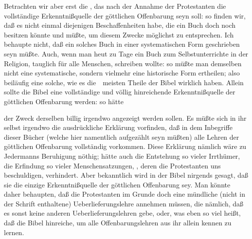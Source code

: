 \begin{aufza}
\begin{aufzb}
\end{aufzb}
\item Betrachten wir aber erst die , das nach der Annahme der Protestanten die vollständige Erkenntnißquelle der göttlichen Offenbarung seyn soll: so finden wir, daß es nicht einmal diejenigen Beschaffenheiten habe, die ein Buch doch noch besitzen könnte und müßte, um diesem Zwecke möglichst zu entsprechen. Ich behaupte nicht, daß ein solches Buch in einer systematischen Form geschrieben seyn müßte. Auch, wenn man heut zu Tage ein Buch zum Selbstunterrichte in der Religion, tauglich für alle Menschen, schreiben wollte: so müßte man demselben nicht eine systematische, sondern vielmehr eine historische Form ertheilen; also beiläufig eine solche, wie es die~\ meisten Theile der Bibel wirklich haben. Allein sollte die Bibel eine vollständige und völlig hinreichende Erkenntnißquelle der göttlichen Offenbarung werden: so hätte
\begin{aufzb}
\item der Zweck derselben billig  irgendwo angezeigt werden sollen. Es müßte sich in ihr selbst irgendwo die ausdrückliche Erklärung vorfinden, daß in dem Inbegriffe dieser Bücher (welche hier namentlich aufgezählt seyn müßten) alle Lehren der göttlichen Offenbarung vollständig vorkommen. Diese Erklärung nämlich wäre zu Jedermanns Beruhigung nöthig;  hätte auch die Entstehung so vieler Irrthümer, die Erfindung so vieler Menschensatzungen, \usw  , deren die Protestanten uns beschuldigen, verhindert. Aber bekanntlich wird in der Bibel nirgends gesagt, daß sie die einzige Erkenntnißquelle der göttlichen Offenbarung sey. Man könnte daher behaupten, daß die Protestanten im Grunde doch eine mündliche (nicht in der Schrift enthaltene) Ueberlieferungslehre annehmen müssen, die nämlich, daß es sonst keine anderen Ueberlieferungslehren gebe, oder, was eben so viel heißt, daß die Bibel hinreiche, um alle Offenbarungslehren aus ihr allein kennen zu lernen.

\end{aufzb}
\end{aufza}
